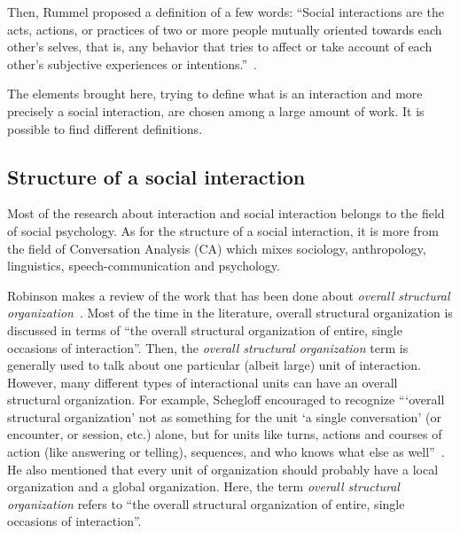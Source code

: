 \documentclass[a4paper,11pt,twoside]{StyleThese}
\begin{document}
Then, Rummel proposed a definition of a few words: ``Social interactions are the acts, actions, or practices of two or more people mutually oriented towards each other's selves, that is, any behavior that tries to affect or take account of each other's subjective experiences or intentions.''~\cite{rummel_1976_understanding}.

The elements brought here, trying to define what is an interaction and more precisely a social interaction, are chosen among a large amount of work. It is possible to find different definitions.

\subsection{Structure of a social interaction}\label{chap1:subsec:social_int}
Most of the research about interaction and social interaction belongs to the field of social psychology. As for the structure of a social interaction, it is more from the field of Conversation Analysis (CA) which mixes sociology, anthropology, linguistics, speech-communication and psychology.

Robinson makes a review of the work that has been done about \emph{overall structural organization}~\cite{robinson_overall_2012}. Most of the time in the literature, overall structural organization is discussed in terms of ``the overall structural organization of entire, single occasions of interaction''. Then, the \emph{overall structural organization} term is generally used to talk about one particular (albeit large) unit of interaction. However, many different types of interactional units can have an overall structural organization. For example, Schegloff encouraged to recognize ``‘overall structural organization’ not as something for the unit ‘a single conversation’ (or encounter, or session, etc.) alone, but for units like turns, actions and courses of action (like answering or telling), sequences, and who knows what else as well''~\cite{schegloff_2011_word}. He also mentioned that every unit of organization should probably have a local organization and a global organization. Here, the term \emph{overall structural organization} refers to ``the overall structural organization of entire, single occasions of interaction''. 
\end{document}
